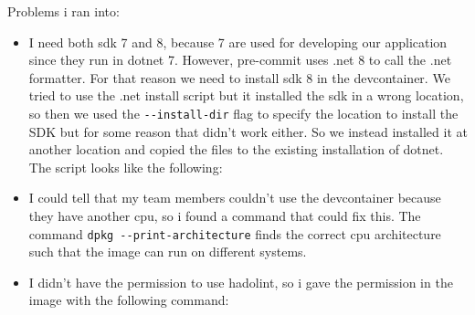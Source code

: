 Problems i ran into:

\begin{itemize}
    \item I need both sdk 7 and 8, because 7 are used for developing our application since they run in dotnet 7. However, pre-commit uses .net 8 to call the .net formatter. For that reason we need to install sdk 8 in the devcontainer. We tried to use the .net install script but it installed the sdk in a wrong location, so then we used the \texttt{-\/-install-dir} flag to specify the location to install the SDK but for some reason that didn't work either. So we instead installed it at another location and copied the files to the existing installation of dotnet. The script looks like the following:




    \item I could tell that my team members couldn't use the devcontainer because they have another cpu, so i found a command that could fix this. The command \texttt{dpkg\ -\/-print-architecture} finds the correct cpu architecture such that the image can run on different systems.

    \item I didn't have the permission to use hadolint, so i gave the permission in the image with the following command:
\end{itemize}


